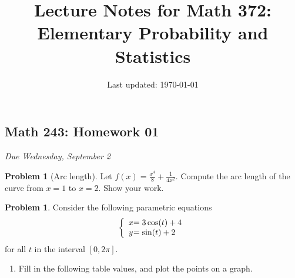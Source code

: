 \documentclass[10pt]{article}
\title{Lecture Notes for Math 372: \\Elementary Probability and Statistics}
\date{Last updated: \today}
\theoremstyle{definition}
\newtheorem{problem}[theorem]{Problem}
\newcommand{\1}[1]{\textbf{1}_{\left[#1\right]}} %
\begin{document}
\begin{center}
  \section*{Math 243: Homework 01}
  \textit{Due Wednesday, September 2}
\end{center}


\begin{problem}[Arc length]
  Let $f(x) = \frac{x^{4}}{8}+ \frac{1}{4x^{2}}$. Compute the arc length of the curve from $x=1$ to
  $x=2$. Show your work. 
\end{problem}



\begin{problem}
  Consider the following parametric equations
  \begin{equation*}
    \left\{ \begin{array}{l@{}l} x &=3\cos(t)+4 \\ y&= \sin(t) +2\end{array}\right.
  \end{equation*}
  for all $t$ in the interval $[0,2\pi]$.
  \begin{enumerate}[(a.)]
    \item Fill in the following table values, and plot the points on a graph.
    \begin{center}
    \end{center}
    

\end{enumerate}
\end{problem}
\end{document}
